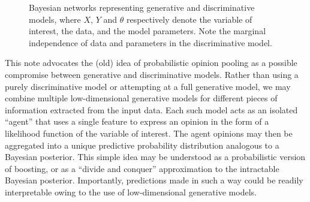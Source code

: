 \documentclass[english]{scrartcl}
\begin{document}

\begin{figure}[!ht]
\begin{center}
\hspace*{.2\textwidth}
\caption{Bayesian networks representing generative and discriminative models, where $X$, $Y$ and $\theta$ respectively denote the variable of interest, the data, and the model parameters. Note the marginal independence of data and parameters in the discriminative model.}
\label{fig:graph_comparison}
\end{center}
\end{figure}

This note advocates the (old) idea of probabilistic opinion pooling \cite{Genest-86} as a possible compromise between generative and discriminative models. Rather than using a purely discriminative model or attempting at a full generative model, we may combine multiple low-dimensional generative models for different pieces of information extracted from the input data. Each such model acts as an isolated ``agent'' that uses a single feature to express an opinion in the form of a likelihood function of the variable of interest. The agent opinions may then be aggregated into a unique predictive probability distribution analogous to a Bayesian posterior. This simple idea may be understood as a probabilistic version of boosting, or as a ``divide and conquer'' approximation to the intractable Bayesian posterior. Importantly, predictions made in such a way could be readily interpretable owing to the use of low-dimensional generative models.
\end{document}
